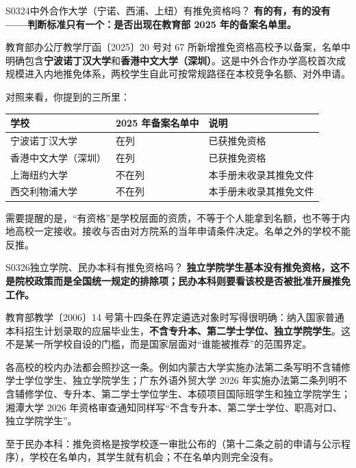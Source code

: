 \begin{qa}{S0324}{中外合作大学（宁诺、西浦、上纽）有推免资格吗？}
\textbf{有的有，有的没有——判断标准只有一个：是否出现在教育部 2025 年的备案名单里。}

教育部办公厅教学厅函〔2025〕20 号对 67 所新增推免资格高校予以备案，名单中明确包含\textbf{宁波诺丁汉大学}和\textbf{香港中文大学（深圳）}。这是中外合作办学高校首次成规模进入内地推免体系，两校学生自此可按常规路径在本校竞争名额、对外申请。

对照来看，你提到的三所里：

\par\vspace{2pt}\nobreak\begin{center}\footnotesize
\begin{tabularx}{\textwidth}{>{\raggedright\arraybackslash}X>{\raggedright\arraybackslash}X>{\raggedright\arraybackslash}X}
\toprule
\textbf{学校} & \textbf{2025 年备案名单中} & \textbf{说明} \\ \midrule
宁波诺丁汉大学 & 在列 & 已获推免资格 \\
香港中文大学（深圳） & 在列 & 已获推免资格 \\
上海纽约大学 & 不在列 & 本手册未收录其推免文件 \\
西交利物浦大学 & 不在列 & 本手册未收录其推免文件 \\
\bottomrule
\end{tabularx}
\end{center}\vspace{2pt}\par

需要提醒的是，“有资格”是学校层面的资质，不等于个人能拿到名额，也不等于内地高校一定接收。接收与否由对方院系的当年申请条件决定。名单之外的学校不能反推。
\end{qa}

\begin{qa}{S0326}{独立学院、民办本科有推免资格吗？}
\textbf{独立学院学生基本没有推免资格，这不是院校政策而是全国统一规定的排除项；民办本科则要看该校是否被批准开展推免工作。}

教育部教学〔2006〕14 号第十四条在界定遴选对象时写得很明确：纳入国家普通本科招生计划录取的应届毕业生，\textbf{不含专升本、第二学士学位、独立学院学生}。这不是某一所学校自设的门槛，而是国家层面对“谁能被推荐”的范围界定。

各高校的校内办法都会照抄这一条。例如内蒙古大学实施办法第二条写明不含辅修学士学位学生、独立学院学生；广东外语外贸大学 2026 年实施办法第二条列明不含辅修学位、专升本、第二学士学位学生、本硕项目国际班学生和独立学院学生；湘潭大学 2026 年资格审查通知同样写“不含专升本、第二学士学位、职高对口、独立学院学生”。

至于民办本科：推免资格是按学校逐一审批公布的（第十二条之前的申请与公示程序），学校在名单内，其学生就有机会；不在名单内则完全没有。
\end{qa}

